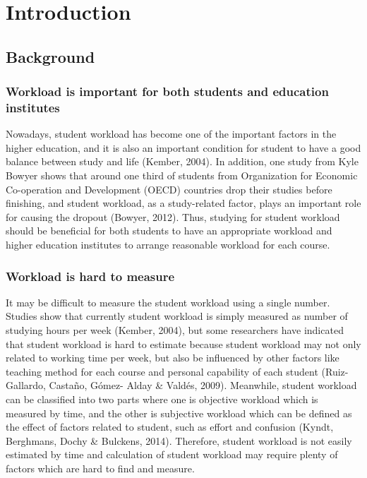 \documentclass[fyp]{socreport}
\begin{document}
\tableofcontents

\chapter{Introduction}

\section{Background}
\subsection{Workload is important for both students and education institutes}
Nowadays, student workload has become one of the important factors in the higher education, and it is also an important condition for student to have a good balance between study and life (Kember, 2004). In addition, one study from Kyle Bowyer shows that around one third of students from Organization for Economic Co-operation and Development (OECD) countries drop their studies before finishing, and student workload, as a study-related factor, plays an important role for causing the dropout (Bowyer, 2012). Thus, studying for student workload should be beneficial for both students to have an appropriate workload and higher education institutes to arrange reasonable workload for each course.

\subsection{Workload is hard to measure}
It may be difficult to measure the student workload using a single number. Studies show that currently student workload is simply measured as number of studying hours per week (Kember, 2004), but some researchers have indicated that student workload is hard to estimate because student workload may not only related to working time per week, but also be influenced by other factors like teaching method for each course and personal capability of each student (Ruiz-Gallardo, Castaño, Gómez- Alday \& Valdés, 2009). Meanwhile, student workload can be classified into two parts where one is objective workload which is measured by time, and the other is subjective workload which can be defined as the effect of factors related to student, such as effort and confusion (Kyndt, Berghmans, Dochy \& Bulckens, 2014). Therefore, student workload is not easily estimated by time and calculation of student workload may require plenty of factors which are hard to find and measure.
\end{document}

